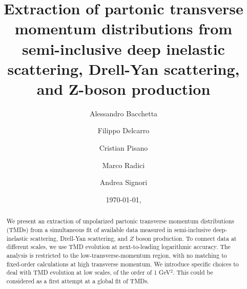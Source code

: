 \documentclass[aps,preprintnumbers,showpacs,nofootinbib,superscriptaddress,floatfix]{revtex4}
\begin{document}
\allowdisplaybreaks[2]


\title{
Extraction of partonic transverse momentum distributions 
from semi-inclusive deep
inelastic scattering, Drell-Yan scattering, and Z-boson production
}

\author{Alessandro Bacchetta}

\author{Filippo Delcarro}

\author{Cristian Pisano}

\author{Marco Radici}

\author{Andrea Signori}


\begin{abstract}
We present an extraction of unpolarized partonic transverse momentum
distributions (TMDs) 
from a simultaneous fit of available data measured in semi-inclusive 
deep-inelastic scattering, 
Drell-Yan scattering, and $Z$ boson production. 
To connect data at different scales, we use TMD evolution at next-to-leading logarithmic accuracy. The
analysis is restricted to the low-transverse-momentum region, with no matching
to fixed-order calculations at high transverse momentum. We introduce specific
choices to deal with TMD evolution at low scales, of the order of 1 GeV$^2$.
This could be considered as a first attempt at a global fit of TMDs.
\end{abstract}


\date{\today, \currenttime}
\end{document}
